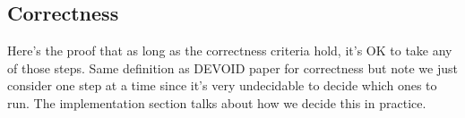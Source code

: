 \subsection{Correctness}

Here's the proof that as long as the correctness criteria hold, it's OK to take any of those steps.
Same definition as DEVOID paper for correctness but note we just consider one step at a time since
it's very undecidable to decide which ones to run. The implementation section talks about how we
decide this in practice.



